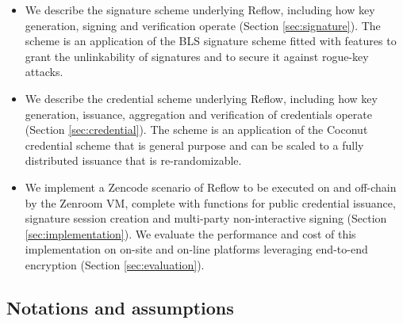\documentclass[twocolumn]{article}
\begin{document}
\begin{itemize}
\item We describe the signature scheme underlying Reflow, including how
  key generation, signing and verification operate (Section
  \ref{sec:signature}). The scheme is an application of the BLS signature scheme
  \citep{asiacrypt-bls} fitted with features to grant the unlinkability of
  signatures and to secure it against rogue-key attacks.
\item We describe the credential scheme underlying Reflow, including how
  key generation, issuance, aggregation and verification of credentials operate
  (Section \ref{sec:credential}). The scheme is an application of the Coconut
  credential scheme \citep{coconut-2018} that is general purpose and can be
  scaled to a fully distributed issuance that is re-randomizable.
\item We implement a Zencode scenario of Reflow to be executed on and
  off-chain by the Zenroom VM, complete with functions for public credential
  issuance, signature session creation and multi-party non-interactive signing
  (Section \ref{sec:implementation}). We evaluate the performance and cost of
  this implementation on on-site and on-line platforms leveraging end-to-end
  encryption (Section \ref{sec:evaluation}).
\end{itemize}

\subsection*{Notations and assumptions}
\end{document}
